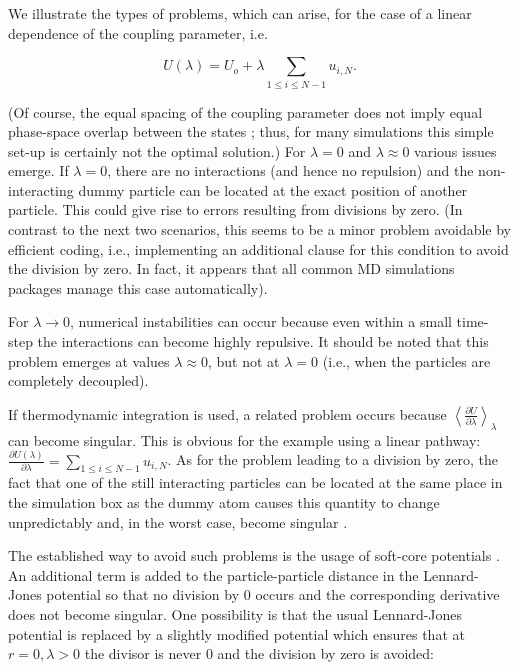 We illustrate the types of problems, which can arise, for the case
of a linear dependence of the coupling parameter,
i.e.

\begin{equation}
U\left(\lambda\right)=U_{o}+\lambda\sum_{1\leq i\leq N-1}u_{i,N}.
\end{equation}


(Of course, the equal spacing of the coupling parameter does not imply
equal phase-space overlap between the states \cite{Shirts.2013};
thus, for many simulations this simple set-up is certainly not the
optimal solution.) For $\lambda=0$ and $\lambda\approx0$ various
issues emerge. If $\lambda=0$, there are no interactions (and hence
no repulsion) and the non-interacting dummy particle can be located
at the exact position of another particle. This could give rise to
errors resulting from divisions by zero. (In contrast to the next two scenarios,
this seems to be a minor problem avoidable by efficient coding, i.e.,
implementing an additional clause for this condition to avoid the division by zero. In fact, it appears that all common MD
simulations packages manage this case automatically\cite{Boresch.2011}).

For $\lambda\rightarrow0$, numerical instabilities can occur because
even within a small time-step the interactions can become highly repulsive.
It should be noted that this problem emerges at values $\lambda\approx0$,
but not at $\lambda=0$ (i.e., when the particles are completely decoupled).

If thermodynamic integration is used, a related problem occurs because
$\left\langle \frac{\partial U}{\partial\lambda}\right\rangle _{\lambda}$can
become singular. This is obvious for the example using a linear pathway:
$\frac{\partial U\left(\lambda\right)}{\partial\lambda}=\sum_{1\leq i\leq N-1}u_{i,N}$.
As for the problem leading to a division by zero, the fact that one of the
still interacting particles can be located at the same place
in the simulation box as the dummy atom causes this quantity to change
unpredictably and, in the worst case, become singular \cite{Boresch.2011}.

The established way to avoid such problems is the usage of soft-core potentials \cite{Beutler.1994,Zacharias.1994,Steinbrecher.2011}.
An additional term is added to the particle-particle distance in the Lennard-Jones potential so that
no division by 0 occurs and the corresponding derivative does not
become singular. One possibility is that the usual Lennard-Jones potential is replaced by
a slightly modified potential which ensures that at $r=0,\lambda>\text{0}$
the divisor is never 0 and the division by zero is avoided:

